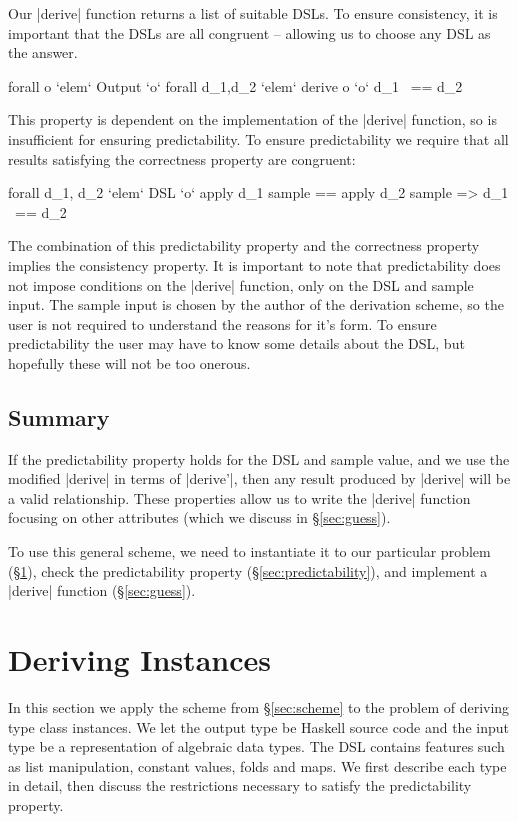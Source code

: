 \documentclass[preprint,draft]{sigplanconf}
\begin{document}
Our |derive| function returns a list of suitable DSLs. To ensure consistency, it is important that the DSLs are all congruent -- allowing us to choose any DSL as the answer.

\ignore\begin{code}
forall o `elem` Output `o` forall d_1,d_2 `elem` derive o `o` d_1 ~== d_2
\end{code}

This property is dependent on the implementation of the |derive| function, so is insufficient for ensuring predictability. To ensure predictability we require that all results satisfying the correctness property are congruent:

\ignore\begin{code}
forall d_1, d_2 `elem` DSL `o`
    apply d_1 sample == apply d_2 sample => d_1 ~== d_2
\end{code}

The combination of this predictability property and the correctness property implies the consistency property. It is important to note that predictability does not impose conditions on the |derive| function, only on the DSL and sample input. The sample input is chosen by the author of the derivation scheme, so the user is not required to understand the reasons for it's form. To ensure predictability the user may have to know some details about the DSL, but hopefully these will not be too onerous.

\subsection{Summary}

If the predictability property holds for the DSL and sample value, and we use the modified |derive| in terms of |derive'|, then any result produced by |derive| will be a valid relationship. These properties allow us to write the |derive| function focusing on other attributes (which we discuss in \S\ref{sec:guess}).

To use this general scheme, we need to instantiate it to our particular problem (\S\ref{sec:instances}), check the predictability property (\S\ref{sec:predictability}), and implement a |derive| function (\S\ref{sec:guess}).

\section{Deriving Instances}
\label{sec:instances}

In this section we apply the scheme from \S\ref{sec:scheme} to the problem of deriving type class instances. We let the output type be Haskell source code and the input type be a representation of algebraic data types. The DSL contains features such as list manipulation, constant values, folds and maps. We first describe each type in detail, then discuss the restrictions necessary to satisfy the predictability property.
\end{document}
